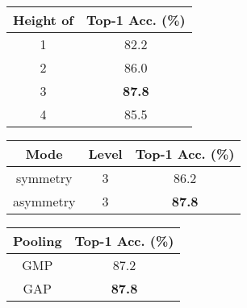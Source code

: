 \documentclass[10pt,twocolumn,letterpaper]{article}
\begin{document}
\begin{table*}[t]
    \begin{minipage}{0.33\linewidth}
    \centering
    { \setlength{\tabcolsep}{6.5pt}
    \caption{Effect of the height of the tree .}
    \vspace{-2mm}
    \label{tab:leaf-node}    
    \begin{tabular}{cc}
    	\toprule
    	Height of  & Top-1 Acc. (\%) \\ \midrule
    	        1          &      82.2       \\
    	        2          &      86.0       \\
    	        3          &    \bf{87.8}    \\
    	        4          &      85.5       \\ \bottomrule
    \end{tabular}}    
    \end{minipage}
   \begin{minipage}{0.33\linewidth}
    \centering
    { \setlength{\tabcolsep}{3.5pt}
    \renewcommand\arraystretch{1.6}
    \caption{Effect of tree architecture.}
     \vspace{-2mm}
    \label{tab:asymmetry}    
    \begin{tabular}{ccc}
    	\toprule
    	  Mode    & Level & Top-1 Acc. (\%) \\ \midrule
    	symmetry  &   3   &      86.2       \\
    	asymmetry &   3   &    \bf{87.8}    \\ \bottomrule
    \end{tabular}}
    \end{minipage}
    \begin{minipage}{0.33\linewidth}
    \centering
    {\setlength{\tabcolsep}{8.5pt}
    \renewcommand\arraystretch{1.55}
     \vspace{-2mm}
    \caption{Comparison between GMP and GAP.}
    \label{tab:pooling}    
    \begin{tabular}{cc}
    	\toprule
    	Pooling & Top-1 Acc. (\%) \\ \midrule
    	  GMP   &      87.2       \\
    	  GAP   &    \bf{87.8}    \\ \bottomrule
    \end{tabular}}    
    \end{minipage}
    \vspace{-2mm}
\end{table*}
\end{document}
